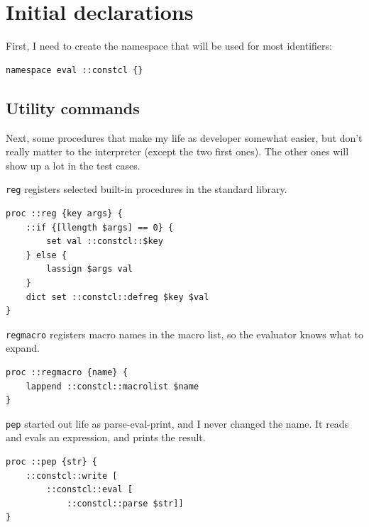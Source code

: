 \documentclass[twoside,9pt]{report}
\begin{document}
\section{Initial declarations}
\label{initial-declarations}

First, I need to create the namespace that will be used for most identifiers:

\noindent\makebox[\linewidth]{\rule{\linewidth}{0.4pt}}
\begin{lstlisting}
namespace eval ::constcl {}
\end{lstlisting}
\noindent\makebox[\linewidth]{\rule{\linewidth}{0.4pt}}
\subsection{Utility commands}
\label{utility-commands}

Next, some procedures that make my life as developer somewhat easier, but don't really matter to the interpreter (except the two first ones). The other ones will show up a lot in the test cases.


\texttt{reg} registers selected built-in procedures in the standard library.

\noindent\makebox[\linewidth]{\rule{\linewidth}{0.4pt}}
\begin{lstlisting}
proc ::reg {key args} {
    ::if {[llength $args] == 0} {
        set val ::constcl::$key
    } else {
        lassign $args val
    }
    dict set ::constcl::defreg $key $val
}
\end{lstlisting}
\noindent\makebox[\linewidth]{\rule{\linewidth}{0.4pt}}

\texttt{regmacro} registers macro names in the macro list, so the evaluator knows what to expand.

\noindent\makebox[\linewidth]{\rule{\linewidth}{0.4pt}}
\begin{lstlisting}
proc ::regmacro {name} {
    lappend ::constcl::macrolist $name
}
\end{lstlisting}
\noindent\makebox[\linewidth]{\rule{\linewidth}{0.4pt}}

\texttt{pep} started out life as parse-eval-print, and I never changed the name. It reads and evals an expression, and prints the result.

\noindent\makebox[\linewidth]{\rule{\linewidth}{0.4pt}}
\begin{lstlisting}
proc ::pep {str} {
    ::constcl::write [
        ::constcl::eval [
            ::constcl::parse $str]]
}
\end{lstlisting}
\noindent\makebox[\linewidth]{\rule{\linewidth}{0.4pt}}
\end{document}
